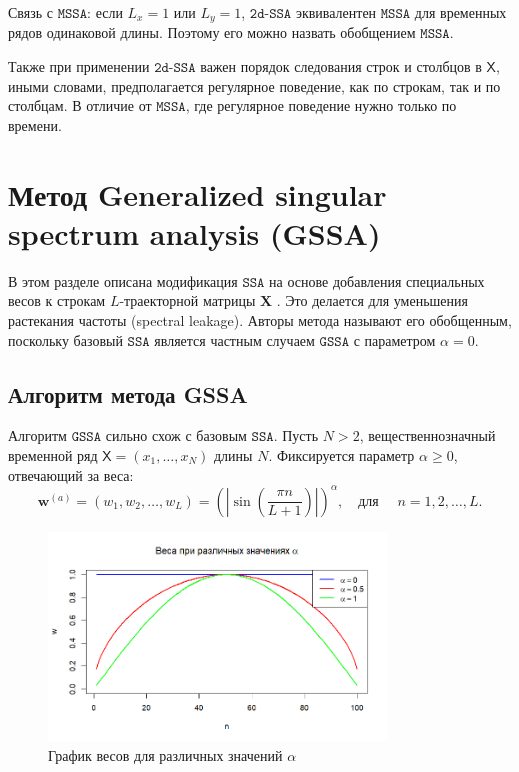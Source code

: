 \documentclass[12pt, specialist, subf
]{disser}
\theoremstyle{definition}
\newcommand{\SSA}{\texttt{SSA}}
\newcommand{\GSSA}{\texttt{GSSA}}
\newcommand{\MSSA}{\texttt{MSSA}}
\newcommand{\DSSA}{\texttt{2d-SSA}}
\newcommand{\TS}{\mathsf{X}}
\begin{document}
{Связь с $\MSSA$:} если $L_x = 1$ или $L_y = 1$, $\DSSA$ эквивалентен $\MSSA$ для временных рядов одинаковой длины. Поэтому его можно назвать обобщением $\MSSA$.

Также при применении $\DSSA$ важен порядок следования строк и столбцов в $\TS$, иными словами, предполагается регулярное поведение, как по строкам, так и по столбцам. В отличие от $\MSSA$, где регулярное поведение нужно только по времени.



\newpage




\chapter{Метод Generalized singular spectrum analysis (GSSA)}
\label{sec:gssa}

В этом разделе описана модификация $\SSA$ на основе добавления специальных весов к строкам $L$-траекторной матрицы $\mathbf{X}$ \cite{gu2024generalized}. Это делается для уменьшения растекания частоты (spectral leakage). Авторы метода называют его обобщенным, поскольку базовый $\SSA$ является частным случаем $\GSSA$ с параметром $\alpha = 0$.

\section{Алгоритм метода GSSA}
Алгоритм $\GSSA$ сильно схож с базовым $\SSA$. Пусть $N > 2$, вещественнозначный временной ряд
$\TS = (x_1, \dots, x_{N})$ длины $N$. Фиксируется параметр $\alpha \geq 0$, отвечающий за веса:
\begin{equation*}
	{\boldsymbol{w}}^{(a)} = (w_{1}, w_{2}, \ldots, w_{L}) = \left( \left| \sin\left(\frac{\pi n}{L+1}\right) \right| \right)^\alpha, \quad \text{для } \quad n = 1, 2, \dots, L.
\end{equation*}

\begin{figure}[h]
	\centering
	\includegraphics[width=0.8\textwidth]{img/weights.png} %
	\caption{График весов для различных значений \(\alpha\)} %
	\label{fig:weights} %
\end{figure}
\end{document}
